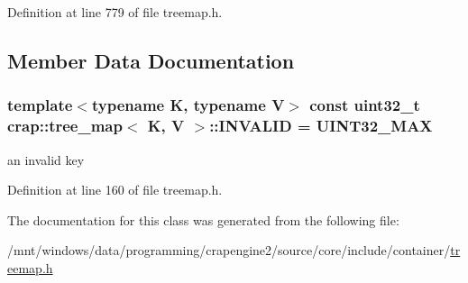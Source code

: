 Definition at line 779 of file treemap.\+h.



\subsection{Member Data Documentation}
\hypertarget{classcrap_1_1tree__map_a56839c4c0ac1ec3167db293f2b31382f}{}
\subsubsection[{I\+N\+V\+A\+L\+I\+D}]{\setlength{\rightskip}{0pt plus 5cm}template$<$typename K, typename V$>$ const uint32\+\_\+t {\bf crap\+::tree\+\_\+map}$<$ K, V $>$\+::I\+N\+V\+A\+L\+I\+D = {\bf U\+I\+N\+T32\+\_\+\+M\+A\+X}\hspace{0.3cm}{\ttfamily [static]}}\label{classcrap_1_1tree__map_a56839c4c0ac1ec3167db293f2b31382f}


an invalid key 



Definition at line 160 of file treemap.\+h.



The documentation for this class was generated from the following file\+:\begin{DoxyCompactItemize}
\item 
/mnt/windows/data/programming/crapengine2/source/core/include/container/\hyperlink{treemap_8h}{treemap.\+h}\end{DoxyCompactItemize}
